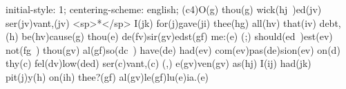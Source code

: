 initial-style: 1;
centering-scheme: english;
(c4)O(g) thou(g) wick(hj~)ed(jv) ser(jv)vant,(jv) <sp>*</sp> I(jk) for(j)gave(ji) thee(hg) all(hv) that(iv) debt,(h) be(hv)cause(g) thou(e) de(fv)sir(gv)edst(gf) me:(e) (;) should(ed~)est(ev) not(fg~) thou(gv) al(gf)so(dc~) have(de) had(ev) com(ev)pas(de)sion(ev) on(d) thy(c) fel(dv)low(ded) ser(c)vant,(c) (,) e(gv)ven(gv) as(hj) I(ij) had(jk) pit(j)y(h) on(ih) thee?(gf) al(gv)le(gf)lu(e)ia.(e)
